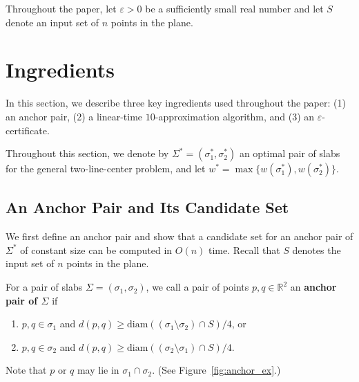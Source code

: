 \documentclass[english,a4paper, cleveref, autoref, thm-restate, nolineno]{socg-lipics-v2021}
\theoremstyle{star}
\theoremstyle{claimstar}
\newcommand{\eps}{\ensuremath{\varepsilon}}
\newcommand{\diam}{\ensuremath{\mathrm{diam}}}
\begin{document}
Throughout the paper, let $\eps > 0$ be a sufficiently small real number and let $S$ denote an input set of $n$ points in the plane.


\section{Ingredients}
\label{sec:polyeps}

In this section, we describe three key ingredients used throughout the paper: (1) an anchor pair, (2) a linear-time $10$-approximation algorithm, and (3) an $\eps$-certificate.




Throughout this section, we denote by $\Sigma^* = (\sigma_1^*, \sigma_2^*)$ an optimal pair of slabs for the general two-line-center problem, and let $w^* = \max \{w(\sigma_1^*), w(\sigma_2^*) \}$.

\subsection{An Anchor Pair and Its Candidate Set}
\label{sec:anchor_pair}
We first define an anchor pair and show that a candidate set for an anchor pair of $\Sigma^*$ of constant size can be computed in $O(n)$ time.
Recall that $S$ denotes the input set of $n$ points in the plane.

\begin{definition}
    For a pair of slabs $\Sigma = (\sigma_1, \sigma_2)$,
    we call a pair of points $p, q \in \mathbb R^2$ an \textbf{anchor pair of $\Sigma$} if 
    \begin{enumerate}[(1)]
        \item $p, q\in \sigma_1$ and $d(p, q) \ge \diam((\sigma_1 \setminus \sigma_2) \cap S)/4$, or 
        \item $p, q\in \sigma_2$ and $d(p, q) \ge \diam((\sigma_2 \setminus \sigma_1) \cap S)/4$.
    \end{enumerate}
     Note that $p$ or $q$ may lie in $\sigma_1\cap \sigma_2$. (See Figure~\ref{fig:anchor_ex}.)
\end{definition} 
\end{document}
